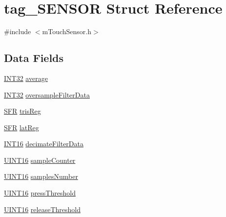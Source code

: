 \hypertarget{structtag___s_e_n_s_o_r}{}\section{tag\+\_\+\+S\+E\+N\+S\+O\+R Struct Reference}
\label{structtag___s_e_n_s_o_r}


{\ttfamily \#include $<$m\+Touch\+Sensor.\+h$>$}

\subsection*{Data Fields}
\begin{DoxyCompactItemize}
\item 
\hyperlink{_generic_type_defs_8h_acb31961b5585201db715eb476f8e1d82}{I\+N\+T32} \hyperlink{structtag___s_e_n_s_o_r_a4e620d91f1a62c365267c7f3d82c9d86}{average}
\item 
\hyperlink{_generic_type_defs_8h_acb31961b5585201db715eb476f8e1d82}{I\+N\+T32} \hyperlink{structtag___s_e_n_s_o_r_a557da5d0d150e7826319a9cf91dd92c4}{oversample\+Filter\+Data}
\item 
\hyperlink{m_touch_sensor_8h_a21cb12f98ab6bc7f80e6fa31286a2f5f}{S\+F\+R} \hyperlink{structtag___s_e_n_s_o_r_a13fff288431a67c8210c3af93b302cac}{tris\+Reg}
\item 
\hyperlink{m_touch_sensor_8h_a21cb12f98ab6bc7f80e6fa31286a2f5f}{S\+F\+R} \hyperlink{structtag___s_e_n_s_o_r_a9be6f1ad6e8a1a3f9ee8468f5f13d1ef}{lat\+Reg}
\item 
\hyperlink{_generic_type_defs_8h_ad87465075f24df28ef66f25e43f0bd5a}{I\+N\+T16} \hyperlink{structtag___s_e_n_s_o_r_a9268ba42d5132ace7b1cc6c08f35d68b}{decimate\+Filter\+Data}
\item 
\hyperlink{_generic_type_defs_8h_acfa284fa8026c4aace2728f7f15d6c13}{U\+I\+N\+T16} \hyperlink{structtag___s_e_n_s_o_r_ab7199a7464c41f1083fe9a4151ae747f}{sample\+Counter}
\item 
\hyperlink{_generic_type_defs_8h_acfa284fa8026c4aace2728f7f15d6c13}{U\+I\+N\+T16} \hyperlink{structtag___s_e_n_s_o_r_a47236f1a24dd4979c5acc271a5767f0f}{samples\+Number}
\item 
\hyperlink{_generic_type_defs_8h_acfa284fa8026c4aace2728f7f15d6c13}{U\+I\+N\+T16} \hyperlink{structtag___s_e_n_s_o_r_a04cc995bb8a5128634a533af78e390fa}{press\+Threshold}
\item 
\hyperlink{_generic_type_defs_8h_acfa284fa8026c4aace2728f7f15d6c13}{U\+I\+N\+T16} \hyperlink{structtag___s_e_n_s_o_r_aacb2db0a5eb444d76fd963c1d249bdc8}{release\+Threshold}

\end{DoxyCompactItemize}
